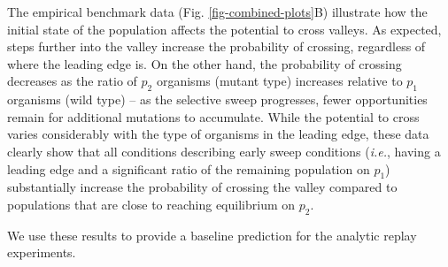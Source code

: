 The empirical benchmark data (Fig. \ref{fig-combined-plots}B) illustrate how the initial state of the population affects the potential to cross valleys.
As expected, steps further into the valley increase the probability of crossing, regardless of where the leading edge is. 
On the other hand, the probability of crossing decreases as the ratio of $p_2$ organisms (mutant type) increases relative to $p_1$ organisms (wild type) -- as the selective sweep progresses, fewer opportunities remain for additional mutations to accumulate. 
While the potential to cross varies considerably with the type of organisms in the leading edge, these data clearly show that all conditions describing early sweep conditions (\textit{i.e.}, having a leading edge and a significant ratio of the remaining population on $p_1$) %
substantially increase the probability of crossing the valley compared to populations that are close to reaching equilibrium on $p_2$. 

We use these results to provide a baseline prediction for the analytic replay experiments. 


